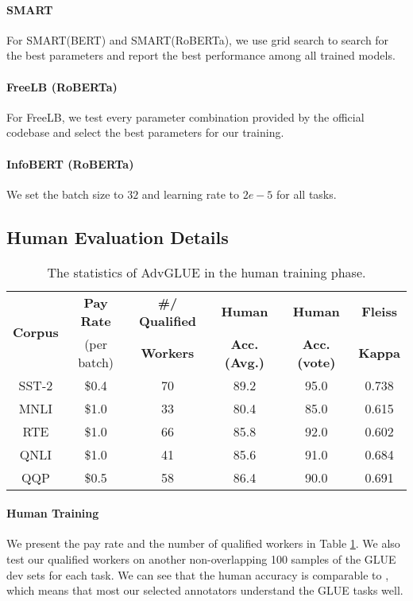 \documentclass{article}
\newcommand{\method}{AdvGLUE\xspace}
\begin{document}
\paragraph{SMART} For SMART(BERT) and SMART(RoBERTa), we use grid search to search for the best parameters and report the best performance among all trained models.

\paragraph{FreeLB (RoBERTa)} For FreeLB, we test every parameter combination provided by the official codebase and select the best parameters for our training.

\paragraph{InfoBERT (RoBERTa)} We set the batch size to $32$ and learning rate to $2e-5$ for all tasks.


\subsection{Human Evaluation Details}

\begin{table}[t]
\small
    \caption{The statistics of \method in the human training phase.}
    \label{tab:humanstat}
    \centering
{
    \begin{tabular}{cccccc}
    \toprule
        \multirow{2}{*}{\textbf{Corpus}} & \textbf{Pay Rate} & \textbf{\#/ Qualified} & \textbf{Human}  & \textbf{Human}  & \textbf{Fleiss}   \\   
        & \scriptsize{(per batch)} & \textbf{Workers} & \textbf{Acc. (Avg.)} & \textbf{Acc. (vote)} & \textbf{Kappa}\\
        \midrule
        SST-2  & \$0.4 & 70 & 89.2 & 95.0 & 0.738 \\
        MNLI  &  \$1.0 & 33 & 80.4 & 85.0 & 0.615 \\
        RTE    & \$1.0 & 66 & 85.8 & 92.0 & 0.602 \\
        QNLI  &  \$1.0 & 41 & 85.6 & 91.0 & 0.684 \\
        QQP   &  \$0.5 & 58 & 86.4 & 90.0 & 0.691  \\
        \bottomrule
        \end{tabular}
    }
\end{table}


\paragraph{Human Training} We present the pay rate and the number of qualified workers in Table \ref{tab:humanstat}. We also test our qualified workers on another non-overlapping 100 samples of the GLUE dev sets for each task. We can see that the human accuracy is comparable to \citep{muppet}, which means that most our selected annotators understand the GLUE tasks well. 
\end{document}
